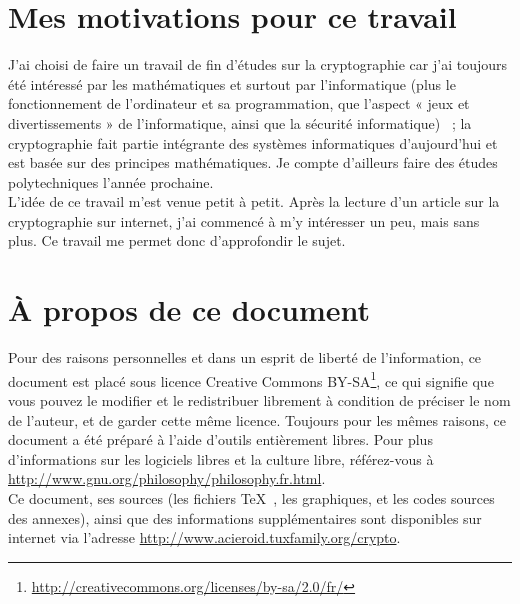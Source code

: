 
\section{Mes motivations pour ce travail}
J'ai choisi de faire un travail de fin d'études sur la cryptographie
car j'ai toujours été intéressé par les mathématiques et surtout par
l'informatique (plus le fonctionnement de l'ordinateur et sa
programmation, que l'aspect « jeux et divertissements » de
l'informatique, ainsi que la sécurité informatique) ~;
la cryptographie fait partie intégrante des
systèmes informatiques d'aujourd'hui et est basée sur des principes
mathématiques. Je compte d'ailleurs faire des études polytechniques
l'année prochaine. \\ L'idée de ce travail m'est venue petit à
petit. Après la lecture d'un article sur la cryptographie sur
internet, j'ai commencé à m'y intéresser un peu, mais sans plus.
 Ce travail me permet donc d'approfondir le sujet.

\section{À propos de ce document}
Pour des raisons personnelles et dans un esprit de liberté de
l'information, ce document est placé sous licence Creative Commons
BY-SA\footnote{\url{http://creativecommons.org/licenses/by-sa/2.0/fr/}}, ce qui
signifie que vous pouvez le modifier et le redistribuer librement à
condition de préciser le nom de l'auteur, et de garder cette même
licence. Toujours pour les mêmes raisons, ce document a été préparé à
l'aide d'outils entièrement libres.
Pour plus d'informations sur les logiciels libres et la culture
libre, référez-vous à \url{http://www.gnu.org/philosophy/philosophy.fr.html}. \\
Ce document, ses sources (les fichiers \TeX~, les graphiques, et les
codes sources des annexes), ainsi que des informations supplémentaires
sont disponibles sur internet via l'adresse
\url{http://www.acieroid.tuxfamily.org/crypto}. \\


